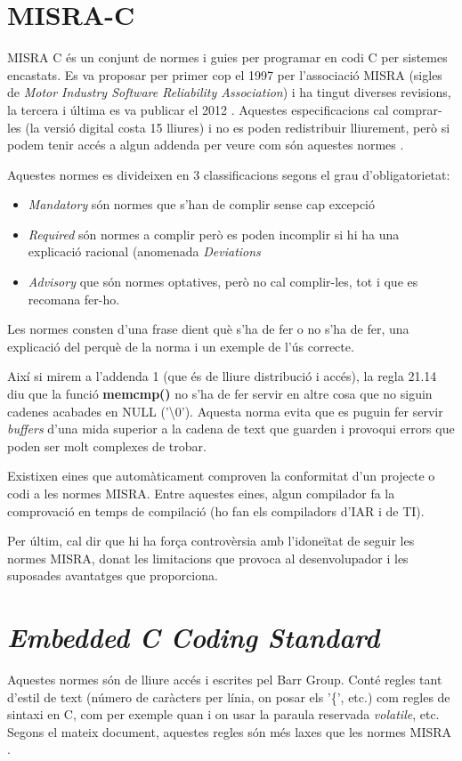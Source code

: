 \section{MISRA-C}
\label{sec:MISRA}
MISRA C és un conjunt de normes i guies per programar en codi C per sistemes encastats. Es va proposar per primer cop el 1997 per l'associació MISRA (sigles de {\em Motor Industry Software Reliability Association}) i ha tingut diverses revisions, la tercera i última es va publicar el 2012 \cite{MISRAHomepage}\cite{MISRAC2012}.
Aquestes especificacions cal comprar-les (la versió digital costa 15 lliures) i no es poden redistribuir lliurement, però si podem tenir accés a algun addenda per veure com són aquestes normes \cite{MISRAAmend}.

Aquestes normes es divideixen en 3 classificacions segons el grau d'obligatorietat:
\begin{itemize}
 \item {\em Mandatory} són normes que s'han de complir sense cap excepció
 \item {\em Required} són normes a complir però es poden incomplir si hi ha una explicació racional (anomenada {\em Deviations}
 \item {\em Advisory} que són normes optatives, però no cal complir-les, tot i que es recomana fer-ho.
\end{itemize}

Les normes consten d'una frase dient què s'ha de fer o no s'ha de fer, una explicació del perquè de la norma i un exemple de l'ús correcte.

Així si mirem a l'addenda 1 \cite[4]{MISRAAmend} (que és de lliure distribució i accés), la regla 21.14 diu que la funció {\bf memcmp()} no s'ha de fer servir en altre cosa que no siguin cadenes acabades en NULL ('\textbackslash 0'). Aquesta norma evita que es puguin fer servir {\em buffers} d'una mida superior a la cadena de text que guarden i provoqui errors que poden ser molt complexes de trobar.

Existixen eines que automàticament comproven la conformitat d'un projecte o codi a les normes MISRA. Entre aquestes eines, algun compilador fa la comprovació en temps de compilació (ho fan els compiladors d'IAR i de TI).

Per últim, cal dir que hi ha força controvèrsia amb l'idoneïtat de seguir les normes MISRA, donat les limitacions que provoca al desenvolupador i les suposades avantatges que proporciona.

\section{\em Embedded C Coding Standard}
Aquestes normes són de lliure accés i escrites pel Barr Group. Conté regles tant d'estil de text (número de caràcters per línia, on posar els '\{', etc.) com regles de sintaxi en C, com per exemple quan i on usar la paraula reservada {\em volatile}, etc. Segons el mateix document, aquestes regles són més laxes que les normes MISRA \cite{BARRGuidelines}.

